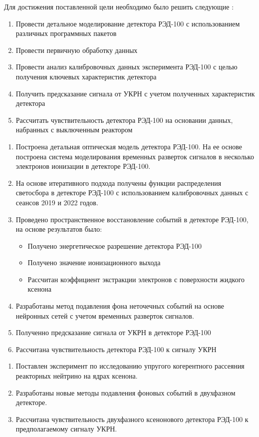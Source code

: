 Для достижения поставленной цели необходимо было решить следующие {\tasks}:
\begin{enumerate}
  \item Провести детальное моделирование детектора РЭД-100 с использованием различных программных пакетов
  \item Провести первичную обработку данных
  \item Провести анализ калибровочных данных эксперимента РЭД-100 с целью получения ключевых характеристик детектора
  \item Получить предсказание сигнала от УКРН с учетом полученных характеристик детектора
  \item Рассчитать чувствительность детектора РЭД-100 на основании данных, набранных с выключенным реактором
\end{enumerate}

\begin{enumerate}
  \item Построена детальная оптическая модель детектора РЭД-100. На ее основе построена система моделирования временных разверток сигналов в несколько электронов ионизации в детекторе РЭД-100.
  \item На основе итеративного подхода получены функции распределения светосбора в детекторе РЭД-100 с использованием калибровочных данных с сеансов 2019 и 2022 годов. 
  \item Проведено пространственное восстановление событий в детекторе РЭД-100, на основе результатов было:
  \begin{itemize}
      \item Получено энергетическое разрешение детектора РЭД-100
      \item Получено значение ионизационного выхода
      \item Рассчитан коэффициент экстракции электронов с поверхности жидкого ксенона
  \end{itemize}
  \item Разработаны метод подавления фона неточечных событий на основе нейронных сетей с учетом временных разверток сигналов.
  \item Полученно предсказание сигнала от УКРН в детекторе РЭД-100
  \item Рассчитана чувствительность детектора РЭД-100 к сигналу УКРН
\end{enumerate}

\novelty
\begin{enumerate}
  \item Поставлен эксперимент по исследованию упругого когерентного рассеяния реакторных нейтрино на ядрах ксенона.
  \item Разработаны новые методы подавления фоновых событий в двухфазном детекторе.
  \item Рассчитана чувствительность двухфазного ксенонового детектора РЭД-100 к предполагаемому сигналу УКРН.
\end{enumerate}

